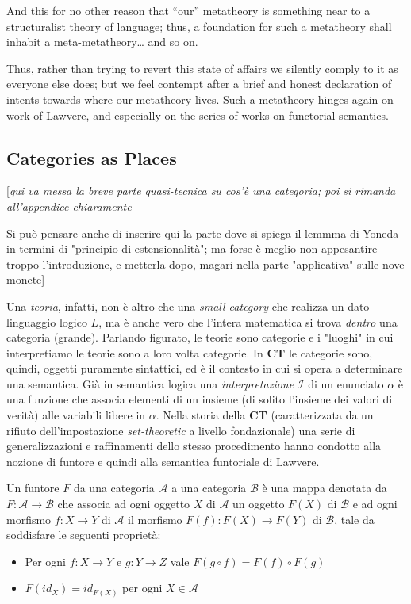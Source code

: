 \documentclass[a4paper, 11pt]{article}
\begin{document}
	And this for no other reason that ``our'' metatheory is something near to a structuralist theory of language; thus, a foundation for such a metatheory shall inhabit a meta-metatheory\dots{} and so on.
	
	Thus, rather than trying to revert this state of affairs we silently comply to it as everyone else does; but we feel contempt after a brief and honest declaration of intents towards where our metatheory lives. Such a metatheory hinges again on work of Lawvere, and especially on the series of works on functorial semantics.
	
	
	\subsection{Categories as Places}
	
	
	[\emph{qui va messa la breve parte quasi-tecnica su cos'è una categoria; poi si rimanda all'appendice chiaramente}
	
	Si può pensare anche di inserire qui la parte dove si spiega il lemmma di Yoneda in termini di "principio di estensionalità"; ma forse è meglio non appesantire troppo l'introduzione, e metterla dopo, magari nella parte "applicativa" sulle nove monete]
	
	
	Una \emph{teoria}, infatti, non è altro che una \emph{small category} che realizza un dato linguaggio logico $L$, ma è anche vero che l'intera matematica si trova \emph{dentro} una categoria (grande). Parlando figurato, le teorie sono categorie e i "luoghi" in cui interpretiamo le teorie sono a loro volta categorie. In \textbf{CT} le categorie sono, quindi, oggetti puramente sintattici, ed è il contesto in cui si opera a determinare una semantica. Già in semantica logica una \emph{interpretazione} $\mathcal{I}$ di un enunciato $\alpha$ è una funzione che associa elementi di un insieme (di solito l'insieme dei valori di verità) alle variabili libere in $\alpha$. Nella storia della \textbf{CT} (caratterizzata da un rifiuto dell'impostazione \emph{set-theoretic} a livello fondazionale) una serie di generalizzazioni e raffinamenti dello stesso procedimento hanno condotto alla nozione di funtore e quindi alla semantica funtoriale di Lawvere.
	
	Un funtore $F$ da una categoria $\mathcal{A}$ a una categoria $\mathcal{B}$ è una mappa denotata da $F: \mathcal{A} \to \mathcal{B}$ che associa ad ogni oggetto $X$ di $\mathcal{A}$ un oggetto $F(X)$ di $\mathcal{B}$ e ad ogni morfismo $f: X \to Y$ di $\mathcal{A}$ il morfismo $F(f): F(X) \to F(Y)$ di $\mathcal{B}$, tale da soddisfare le seguenti proprietà:
	\begin{itemize}
		\item Per ogni $f: X \to Y$ e $g: Y \to Z$ vale $F(g \circ f)= F(f) \circ F(g)$
		\item $F(id_X) = id_{F(X)}$ per ogni $X \in \mathcal{A}$
	\end{itemize}
	
\end{document}
